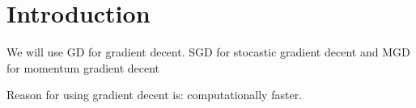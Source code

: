 \section{Introduction}
We will use GD for gradient decent. SGD for stocastic gradient decent and MGD for momentum gradient decent

Reason for using gradient decent is: computationally faster.
